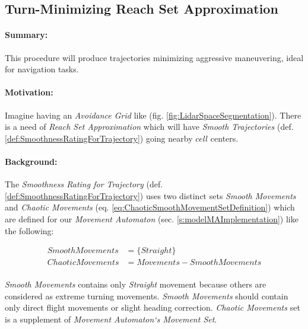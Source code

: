\subsection{Turn-Minimizing Reach Set Approximation}\label{s:harmonicReachSet}

\paragraph{Summary:} This procedure will produce trajectories minimizing aggressive maneuvering, ideal for navigation tasks.

\paragraph{Motivation:} Imagine having an \emph{Avoidance Grid} like (fig. \ref{fig:LidarSpaceSegmentation}). There is a need of \emph{Reach Set Approximation} which will have \emph{Smooth Trajectories} (def. \ref{def:SmoothnessRatingForTrajectory}) going nearby $cell$ centers.

\paragraph{Background:} The \emph{Smoothness Rating for Trajectory} (def. \ref{def:SmoothnessRatingForTrajectory}) uses two distinct sets \emph{Smooth Movements} and \emph{Chaotic Movements} (eq. \ref{eq:ChaoticSmoothMovementSetDefinition}) which are defined for our \emph{Movement Automaton}  (sec. \ref{s:modelMAImplementation}) like the following:

\begin{equation}
    \begin{aligned}
    Smooth Movements &= \{Straight\} \\
    Chaotic Movements &= Movements - Smooth Movements\\
    \end{aligned}
\end{equation}

\emph{Smooth Movements} contains only \emph{Straight} movement because others are considered as extreme turning movements. \emph{Smooth Movements} should contain only direct flight movements or slight heading correction. \emph{Chaotic Movements} set is a  supplement of \emph{Movement Automaton`s Movement Set}. 

